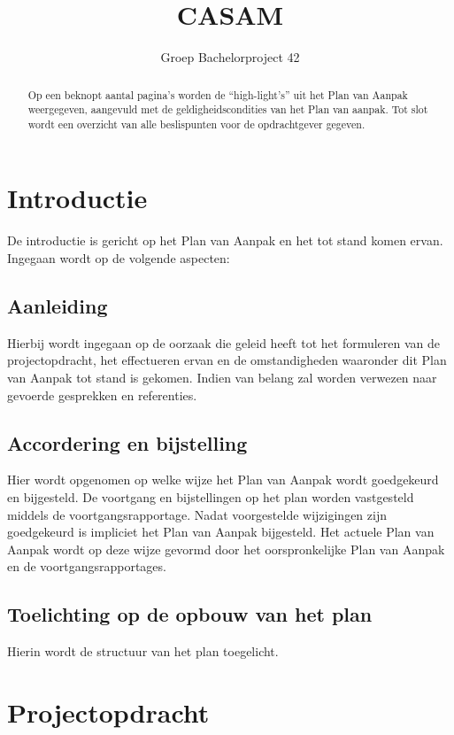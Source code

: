 \documentclass{article}
\title{CASAM}
\author{Groep Bachelorproject 42}
\date{}
\begin{document}
\maketitle
\thispagestyle{empty}

\begin{abstract}

Op een beknopt aantal pagina's worden de ``high-light's'' uit het Plan van Aanpak weergegeven,
aangevuld met de geldigheidscondities van het Plan van aanpak.
Tot slot wordt een overzicht van alle beslispunten voor de opdrachtgever gegeven.

\end{abstract}

\section{Introductie}

De introductie is gericht op het Plan van Aanpak en het tot stand komen ervan.
Ingegaan wordt op de volgende aspecten:

\subsection{Aanleiding}
Hierbij wordt ingegaan op de oorzaak die geleid heeft tot het formuleren van de projectopdracht,
het effectueren ervan en de omstandigheden waaronder dit Plan van Aanpak tot stand is gekomen.
Indien van belang zal worden verwezen naar gevoerde gesprekken en referenties.

\subsection{Accordering en bijstelling}
Hier wordt opgenomen op welke wijze het Plan van Aanpak wordt goedgekeurd en bijgesteld.
De voortgang en bijstellingen op het plan worden vastgesteld middels de voortgangsrapportage.
Nadat voorgestelde wijzigingen zijn goedgekeurd is impliciet het Plan van Aanpak bijgesteld.
Het actuele Plan van Aanpak wordt op deze wijze gevormd door het oorspronkelijke Plan van Aanpak en de voortgangsrapportages.

\subsection{Toelichting op de opbouw van het plan}
Hierin wordt de structuur van het plan toegelicht.

\section{Projectopdracht}
\end{document}
